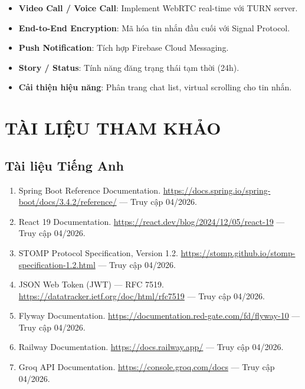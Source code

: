 \documentclass[12pt,a4paper]{report}
\begin{document}
\begin{itemize}
    \item \textbf{Video Call / Voice Call}: Implement WebRTC real-time với TURN server.
    \item \textbf{End-to-End Encryption}: Mã hóa tin nhắn đầu cuối với Signal Protocol.
    \item \textbf{Push Notification}: Tích hợp Firebase Cloud Messaging.
    \item \textbf{Story / Status}: Tính năng đăng trạng thái tạm thời (24h).
    \item \textbf{Cải thiện hiệu năng}: Phân trang chat list, virtual scrolling cho tin nhắn.
\end{itemize}

\chapter*{TÀI LIỆU THAM KHẢO}

\section*{Tài liệu Tiếng Anh}

\begin{enumerate}
    \item Spring Boot Reference Documentation. \url{https://docs.spring.io/spring-boot/docs/3.4.2/reference/} --- Truy cập 04/2026.
    \item React 19 Documentation. \url{https://react.dev/blog/2024/12/05/react-19} --- Truy cập 04/2026.
    \item STOMP Protocol Specification, Version 1.2. \url{https://stomp.github.io/stomp-specification-1.2.html} --- Truy cập 04/2026.
    \item JSON Web Token (JWT) --- RFC 7519. \url{https://datatracker.ietf.org/doc/html/rfc7519} --- Truy cập 04/2026.
    \item Flyway Documentation. \url{https://documentation.red-gate.com/fd/flyway-10} --- Truy cập 04/2026.
    \item Railway Documentation. \url{https://docs.railway.app/} --- Truy cập 04/2026.
    \item Groq API Documentation. \url{https://console.groq.com/docs} --- Truy cập 04/2026.
\end{enumerate}
\end{document}
